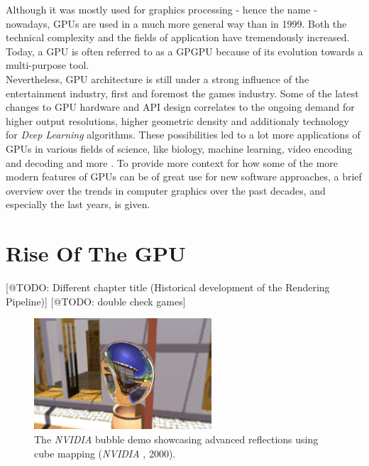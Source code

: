 \noindent
Although it was mostly used for graphics processing - hence the name - nowadays, \ac{GPU}s are used 
in a much more general way than in 1999. Both the technical complexity and the fields of application 
have tremendously increased. Today, a \ac{GPU} is often referred to as a \ac{GPGPU} because of its 
evolution towards a multi-purpose tool. \\

\noindent
Nevertheless, \ac{GPU} architecture is still under a strong influence of the entertainment 
industry, first and foremost the games industry. Some of the latest changes to \ac{GPU} 
hardware and \ac{API} design correlates to the ongoing demand for higher output resolutions, 
higher geometric density and additionaly technology for \emph{Deep Learning} algorithms. 
These possibilities led to a lot more applications of \ac{GPU}s in various fields of science, 
like biology, machine learning, video encoding and decoding and more \cite{Battaglia2024}.
To provide more context for how some of the more modern features of \ac{GPU}s can be of great 
use for new software approaches, a brief overview over the trends in computer graphics over 
the past decades, and especially the last years, is given.


\section{Rise Of The GPU} \label{sec-rise-of-the-gpu}
[@TODO: Different chapter title (Historical development of the Rendering Pipeline)]
[@TODO: double check games]

\begin{figure}[h]
    \centering
    \includegraphics[width=250px]{images/graphics/bubble-reflection-effects-demo.jpg}
    \caption{The \emph{NVIDIA} bubble demo showcasing advanced reflections using cube mapping (\emph{NVIDIA} \cite{NVIDIABubble}, 2000).}
    \label{fig:bubble-reflection-demo}
\end{figure}

